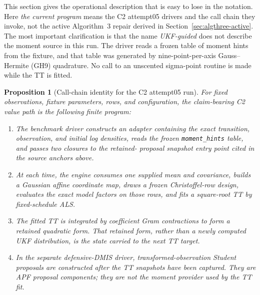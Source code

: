 \documentclass[11pt]{article}
\newtheorem{proposition}{Proposition}
\begin{document}
This section gives the operational description that is easy to lose in the
notation.  Here \emph{the current program} means the C2 attempt05 drivers and
the call chain they invoke, not the active Algorithm~3 repair derived in
Section~\ref{sec:algthree-active}.  The most important clarification is that
the name \emph{UKF-guided} does not describe the moment source in this run.
The driver reads a frozen table of moment hints from the fixture, and that
table was generated by nine-point-per-axis Gauss--Hermite (GH9) quadrature.
No call to an unscented sigma-point routine is made while the TT is fitted.

\begin{proposition}[Call-chain identity for the C2 attempt05 run]
\label{prop:actual-call-chain}
For fixed observations, fixture parameters, rows, and configuration, the
claim-bearing C2 value path is the following finite program:

\begin{enumerate}
\item The benchmark driver constructs an adapter containing the exact
  transition, observation, and initial log densities, reads the frozen
  \texttt{moment\_hints} table, and passes two closures to the retained-
  proposal snapshot entry point cited in the source anchors above.
\item At each time, the engine consumes one supplied mean and covariance,
  builds a Gaussian affine coordinate map, draws a frozen Christoffel-row
  design, evaluates the exact model factors on those rows, and fits a
  square-root TT by fixed-schedule ALS.
\item The fitted TT is integrated by coefficient Gram contractions to form a
  retained quadratic form.  That retained form, rather than a newly computed
  UKF distribution, is the state carried to the next TT target.
\item In the separate defensive-DMIS driver, transformed-observation Student
  proposals are constructed \emph{after} the TT snapshots have been captured.
  They are APF proposal components; they are not the moment provider used by
  the TT fit.
\end{enumerate}
\end{proposition}
\end{document}
